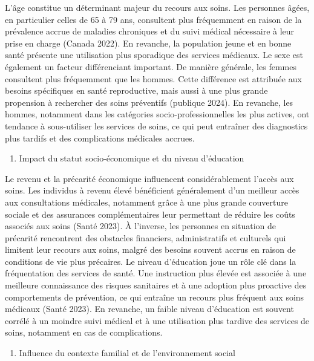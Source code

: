 \documentclass[
]{article}
\providecommand{\tightlist}{%
  \setlength{\itemsep}{0pt}\setlength{\parskip}{0pt}}
\begin{document}
L'âge constitue un déterminant majeur du recours aux soins. Les
personnes âgées, en particulier celles de 65 à 79 ans, consultent plus
fréquemment en raison de la prévalence accrue de maladies chroniques et
du suivi médical nécessaire à leur prise en charge (Canada 2022). En
revanche, la population jeune et en bonne santé présente une utilisation
plus sporadique des services médicaux. Le sexe est également un facteur
différenciant important. De manière générale, les femmes consultent plus
fréquemment que les hommes. Cette différence est attribuée aux besoins
spécifiques en santé reproductive, mais aussi à une plus grande
propension à rechercher des soins préventifs (publique 2024). En
revanche, les hommes, notamment dans les catégories
socio-professionnelles les plus actives, ont tendance à sous-utiliser
les services de soins, ce qui peut entraîner des diagnostics plus
tardifs et des complications médicales accrues.

\begin{enumerate}
\def\labelenumi{\arabic{enumi}.}
\setcounter{enumi}{1}
\tightlist
\item
  Impact du statut socio-économique et du niveau d'éducation
\end{enumerate}

Le revenu et la précarité économique influencent considérablement
l'accès aux soins. Les individus à revenu élevé bénéficient généralement
d'un meilleur accès aux consultations médicales, notamment grâce à une
plus grande couverture sociale et des assurances complémentaires leur
permettant de réduire les coûts associés aux soins (Santé 2023). À
l'inverse, les personnes en situation de précarité rencontrent des
obstacles financiers, administratifs et culturels qui limitent leur
recours aux soins, malgré des besoins souvent accrus en raison de
conditions de vie plus précaires. Le niveau d'éducation joue un rôle clé
dans la fréquentation des services de santé. Une instruction plus élevée
est associée à une meilleure connaissance des risques sanitaires et à
une adoption plus proactive des comportements de prévention, ce qui
entraîne un recours plus fréquent aux soins médicaux (Santé 2023). En
revanche, un faible niveau d'éducation est souvent corrélé à un moindre
suivi médical et à une utilisation plus tardive des services de soins,
notamment en cas de complications.

\begin{enumerate}
\def\labelenumi{\arabic{enumi}.}
\setcounter{enumi}{2}
\tightlist
\item
  Influence du contexte familial et de l'environnement social
\end{enumerate}
\end{document}
